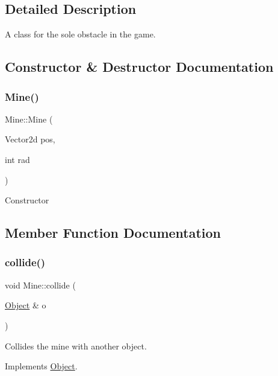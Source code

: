 \subsection{Detailed Description}
A class for the sole obstacle in the game. 

\subsection{Constructor \& Destructor Documentation}
\hypertarget{classMine_a20441a92f269fcd5f011c2dc40642838}{}\label{classMine_a20441a92f269fcd5f011c2dc40642838} 
\subsubsection{\texorpdfstring{Mine()}{Mine()}}
{\footnotesize\ttfamily Mine\+::\+Mine (\begin{DoxyParamCaption}\item[{Vector2d}]{pos,  }\item[{int}]{rad }\end{DoxyParamCaption})}

Constructor 

\subsection{Member Function Documentation}
\hypertarget{classMine_a8f28428004ed7bd212913d74fc242b3f}{}\label{classMine_a8f28428004ed7bd212913d74fc242b3f} 
\subsubsection{\texorpdfstring{collide()}{collide()}}
{\footnotesize\ttfamily void Mine\+::collide (\begin{DoxyParamCaption}\item[{\hyperlink{classObject}{Object} \&}]{o }\end{DoxyParamCaption})\hspace{0.3cm}{\ttfamily [virtual]}}

Collides the mine with another object. 

Implements \hyperlink{classObject}{Object}.

\hypertarget{classMine_a03dc6fa52215e83fe6a1aadc18c9b163}{}\label{classMine_a03dc6fa52215e83fe6a1aadc18c9b163} 

